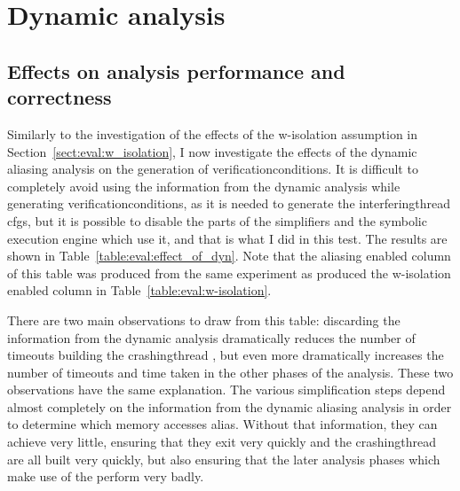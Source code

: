 \section{Dynamic analysis}
\label{sect:eval:dynamic_analysis}

\subsection{Effects on analysis performance and correctness}


Similarly to the investigation of the effects of the \gls{w-isolation}
assumption in Section~\ref{sect:eval:w_isolation}, I now investigate
the effects of the dynamic aliasing analysis on the generation of
\glspl{verificationcondition}.  It is difficult to
completely avoid using the information from the dynamic analysis while
generating \glspl{verificationcondition}, as it is needed to generate
the \gls{interferingthread} \glspl{cfg}, but it is possible to disable
the parts of the {\StateMachine} simplifiers and the symbolic
execution engine which use it, and that is what I did in this test.
The results are shown in Table~\ref{table:eval:effect_of_dyn}.  Note
that the aliasing enabled column of this table was produced from the
same experiment as produced the \gls{w-isolation} enabled column in
Table~\ref{table:eval:w-isolation}.

There are two main observations to draw from this table: discarding
the information from the dynamic analysis dramatically reduces the
number of timeouts building the \gls{crashingthread} {\StateMachines},
but even more dramatically increases the number of timeouts and time
taken in the other phases of the analysis.  These two observations
have the same explanation.  The various {\StateMachine} simplification
steps depend almost completely on the information from the dynamic
aliasing analysis in order to determine which memory accesses alias.
Without that information, they can achieve very little, ensuring that
they exit very quickly and the \gls{crashingthread} {\StateMachines}
are all built very quickly, but also ensuring that the later analysis
phases which make use of the {\StateMachines} perform very badly.

